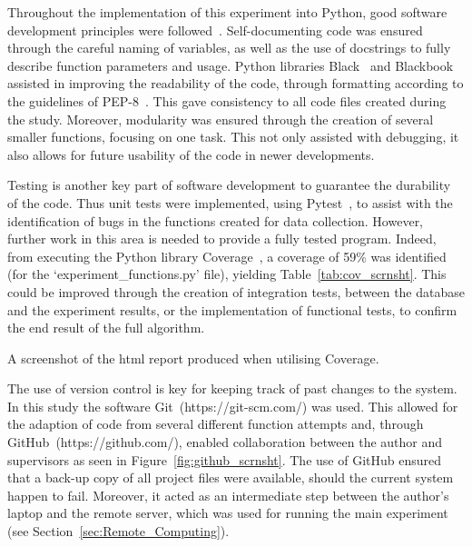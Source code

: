 Throughout the implementation of this experiment into Python, good software
development principles were followed~\cite{Jimenez2017, Sandve2013, Wilson2014}. Self-documenting code was 
ensured through the careful naming of variables, as well as the use of 
docstrings to fully describe function parameters and usage. Python libraries 
Black~\cite{Langa2019} and Blackbook~\cite{Knight2019c} assisted in improving the readability of the code, through 
formatting according to the guidelines of PEP-8~\cite{Rossum2001}. This gave consistency to all 
code files created during the study. Moreover, modularity was ensured through the creation of several 
smaller functions, focusing on one task. This not only assisted with debugging,
it also allows for future usability of the code in newer developments.

Testing is another key part of software development to guarantee the durability of 
the code. Thus unit tests were implemented, using Pytest~\cite{pytestx.y}, to
assist with the 
identification of bugs in the functions created for data collection. However, 
further work in this area is needed to provide a fully tested program. 
Indeed, from executing the Python library Coverage~\cite{Batchelder2020}, a
coverage of 59\% was identified (for the `experiment\_functions.py' file), 
yielding Table~\ref{tab:cov_scrnsht}. This could be improved through the creation of 
integration tests, between the database and the experiment results, or the 
implementation of functional tests, to confirm the end result of the full 
algorithm.

\begin{table}
    \centering
    \resizebox{\textwidth}{!}{}
    \caption{A screenshot of the html report produced when utilising Coverage.}\label{tab:cov_scrnsht}
\end{table}

The use of version control is key for keeping track of past changes 
to the system. In this study the software Git~(https://git-scm.com/) was used. This allowed for the 
adaption of code from several different function attempts and, through GitHub~(https://github.com/), 
enabled collaboration between the author and supervisors as seen
in Figure~\ref{fig:github_scrnsht}. The use of GitHub ensured that a back-up copy
of all project files 
were available, should the current system happen to fail. Moreover, it acted as
an intermediate step between the author's laptop and the remote server, which
was used for
running the main experiment (see Section~\ref{sec:Remote_Computing}).

